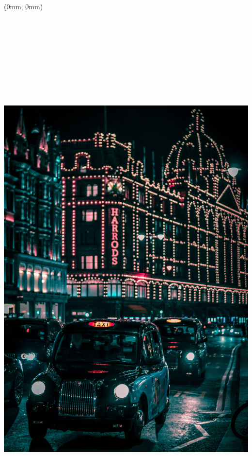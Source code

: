 \documentclass[
  a4paper,
  twoside, 11pt]{article}
\author{}
\date{\vspace{-2.5em}}
\begin{document}
\frenchspacing

\raggedright

\raggedbottom

\begin{textblock*}{21cm}(0mm, 0mm)
\includegraphics[width=21cm,height=29.7cm]{../2022_q1/cover_image_2022_q1.jpg}
\end{textblock*}
\end{document}
